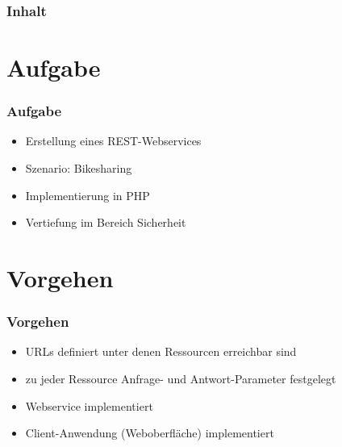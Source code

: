 \begin{frame}
	\frametitle*{Inhalt}
	\tableofcontents
\end{frame}

\section{Aufgabe}
\begin{frame}
	\frametitle*{Aufgabe}
	\begin{itemize}
		\item Erstellung eines REST-Webservices
		\item Szenario: Bikesharing
		\item Implementierung in PHP
		\item Vertiefung im Bereich Sicherheit
	\end{itemize}
\end{frame}

\section{Vorgehen}
\begin{frame}
	\frametitle*{Vorgehen}
	\begin{itemize}
		\item URLs definiert unter denen Ressourcen erreichbar sind
		\item zu jeder Ressource Anfrage- und Antwort-Parameter festgelegt
		\item Webservice implementiert
		\item Client-Anwendung (Weboberfläche) implementiert
	\end{itemize}
\end{frame}

